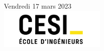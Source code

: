 \documentclass[10pt,a4paper]{article}
\begin{document}
\begin{titlepage}


{\large Vendredi 17 mars 2023}\\[2cm] %


\includegraphics[width=200px, keepaspectratio]{img/Logo_cesi_2022.png}\\[1cm] %
 

\vfill %

\end{titlepage}
\newpage
\tableofcontents
\newpage

\end{document}
